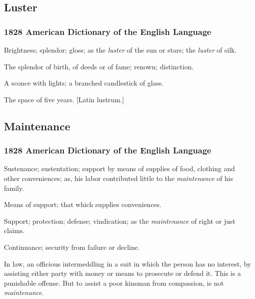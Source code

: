 	\subsection{Luster} %
		\label{LUSTER}
		
		\subsubsection{1828 American Dictionary of the English Language}

			\begin{compactitem}
				\item[1] Brightness; splendor; gloss; as the \textit{luster} of the sun or stars; the \textit{luster} of silk.
				\item[2] The splendor of birth, of deeds or of fame; renown; distinction.
				\item[3] A sconce with lights; a branched candlestick of glass.
				\item[4] The space of five years. [Latin lustrum.]
			\end{compactitem}


	\subsection{Maintenance} %
		\label{MAINTENANCE}
		
		\subsubsection{1828 American Dictionary of the English Language}
		
			\begin{compactitem}
				\item Sustenance; sustentation; support by means of supplies of food, clothing and other conveniences; as, his labor contributed little to the \textit{maintenance} of his family.
				\item[1] Means of support; that which supplies conveniences.
				\item[2] Support; protection; defense; vindication; as the \textit{maintenance} of right or just claims.
				\item[3] Continuance; security from failure or decline.
				\item[4] In law, an officious intermeddling in a suit in which the person has no interest, by assisting either party with money or means to prosecute or defend it. This is a punishable offense. But to assist a poor kinsman from compassion, is not \textit{maintenance}.
			\end{compactitem}


